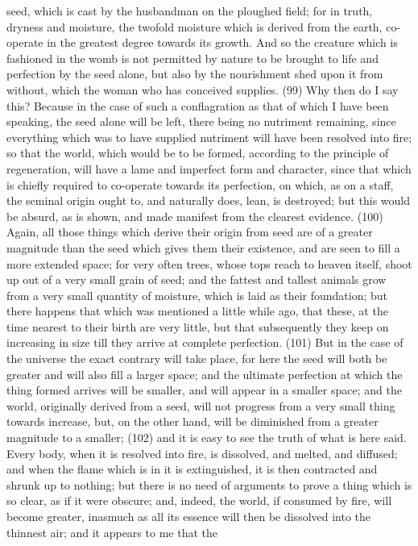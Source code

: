 seed, which is cast by the husbandman on the ploughed field; for in truth, dryness and moisture,
the twofold moisture which is derived from the earth, co-operate in the greatest degree towards its
growth. And so the creature which is fashioned in the womb is not permitted by nature to be
brought to life and perfection by the seed alone, but also by the nourishment shed upon it from
without, which the woman who has conceived supplies. (99) Why then do I say this? Because in
the case of such a conflagration as that of which I have been speaking, the seed alone will be left,
there being no nutriment remaining, since everything which was to have supplied nutriment will have
been resolved into fire; so that the world, which would be to be formed, according to the principle of
regeneration, will have a lame and imperfect form and character, since that which is chiefly
required to co-operate towards its perfection, on which, as on a staff, the seminal origin ought to,
and naturally does, lean, is destroyed; but this would be absurd, as is shown, and made manifest
from the clearest evidence. (100) Again, all those things which derive their origin from seed are of
a greater magnitude than the seed which gives them their existence, and are seen to fill a more
extended space; for very often trees, whose tops reach to heaven itself, shoot up out of a very
small grain of seed; and the fattest and tallest animals grow from a very small quantity of moisture,
which is laid as their foundation; but there happens that which was mentioned a little while ago, that
these, at the time nearest to their birth are very little, but that subsequently they keep on increasing
in size till they arrive at complete perfection. (101) But in the case of the universe the exact
contrary will take place, for here the seed will both be greater and will also fill a larger space; and
the ultimate perfection at which the thing formed arrives will be smaller, and will appear in a smaller
space; and the world, originally derived from a seed, will not progress from a very small thing
towards increase, but, on the other hand, will be diminished from a greater magnitude to a smaller;
(102) and it is easy to see the truth of what is here said. Every body, when it is resolved into fire, is
dissolved, and melted, and diffused; and when the flame which is in it is extinguished, it is then
contracted and shrunk up to nothing; but there is no need of arguments to prove a thing which is so
clear, as if it were obscure; and, indeed, the world, if consumed by fire, will become greater,
inasmuch as all its essence will then be dissolved into the thinnest air; and it appears to me that the

